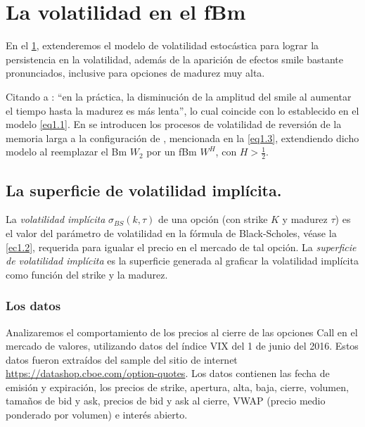 \documentclass[letterpaper,12pt,oneside]{book}
\theoremstyle{plain}
\numberwithin{theorem}{section}
\begin{document}



\chapter{La volatilidad en el fBm}\label{ch:2}
En el \cref{ch:2}, extenderemos el modelo de volatilidad estocástica para lograr la persistencia en la volatilidad, además de la aparición de efectos smile bastante pronunciados, inclusive para opciones de madurez muy alta.

Citando a \cite{comte_long_1998}: ``en la práctica, la disminución de la amplitud del smile al aumentar el tiempo hasta la madurez es más lenta'', lo cual coincide con lo establecido en el modelo \ref{eq1.1}. En \cite{comte_long_1998} se introducen los procesos de volatilidad de reversión de la memoria larga a la configuración de \cite{hull_one-factor_1993}, mencionada en la \cref{eq1.3}, extendiendo dicho modelo al reemplazar el Bm $W_2$ por un fBm $W^H$,  con $H>\frac{1}{2}$.
\section{La superficie de volatilidad implícita.}
La \textsl{volatilidad implícita} $\sigma_{BS}(k,\tau)$ de una opción (con strike $K$ y madurez $\tau$) es el valor del parámetro de volatilidad en la fórmula de Black-Scholes, véase la \cref{ec1.2}, requerida para igualar el precio en el mercado de tal opción. La \textsl{superficie de volatilidad implícita} es la superficie generada al graficar la volatilidad implícita como función del strike y  la madurez.

\subsection{Los datos}
Analizaremos el comportamiento de los precios al cierre de las opciones Call en el mercado de valores, utilizando datos del índice VIX del 1 de junio del 2016.
Estos datos fueron extraídos del sample del sitio de internet \url{https://datashop.cboe.com/option-quotes}. Los datos contienen las fecha de emisión y expiración, los precios de strike, apertura, alta, baja, cierre, volumen, tamaños de bid y ask, precios de bid y ask al cierre, VWAP (precio medio ponderado por volumen) e interés abierto.
\end{document}
